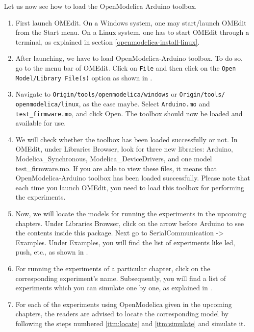 Let us now see how to load the OpenModelica Arduino toolbox. 
\begin{enumerate}
      \item First launch OMEdit. On a Windows system, one may start/launch
            OMEdit from the Start menu. On a Linux system, one has to
            start OMEdit through a terminal, as
            explained in section \ref{openmodelica-install-linux}.
      \item After launching, we have to load OpenModelica-Arduino
            toolbox. To do so, go to the menu bar of OMEdit. 
            Click on {\tt File} and then click on
            the {\tt Open Model/Library File(s)} option as shown in .
      \item Navigate to {\tt Origin/tools/openmodelica/windows} or {\tt Origin/tools/\\openmodelica/linux}, as the case maybe.
            Select {\tt Arduino.mo} and \\{\tt test\_firmware.mo}, and click Open. The toolbox should now be loaded and available for use. 
      \item \label{itm:library} We will check whether the toolbox has been loaded successfully or not. 
            In OMEdit, under Libraries Browser, look for three new libraries: Arduino,
            Modelica\_Synchronous, Modelica\_DeviceDrivers, and one model test\_firmware.mo. 
            If you are able to view these files, it means that OpenModelica-Arduino toolbox has been loaded successfully. 
            Please note that each time you launch OMEdit, you need to load this toolbox for
            performing the experiments. 
      \item \label{itm:locate} Now, we will locate the models for running the experiments in the upcoming chapters. 
            Under Libraries Browser, click on the arrow before Arduino to see the 
            contents inside this package. Next go to SerialCommunication -> Examples. 
            Under Examples, you will find the list of experiments like led, push, etc., 
            as shown in .
      \item \label{itm:simulate} For running the experiments of a particular chapter, click on the corresponding 
            experiment's name. Subsequently, you will find a list of experiments which you can 
            simulate one by one, as explained in .
      \item For each of the experiments using OpenModelica given in the upcoming chapters, the readers 
            are advised to locate the corresponding model by following the steps
            numbered \ref{itm:locate} and \ref{itm:simulate} and simulate it.  
\end{enumerate}



